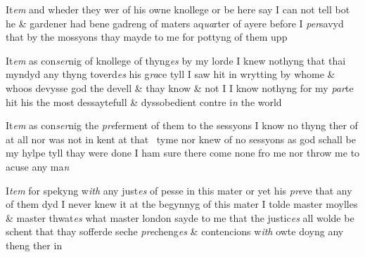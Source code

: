 \documentclass[12pt, a4paper]{book}
\begin{document}
            		
            			
				\marginpar[\vspace{0.5cm}{\textcolor{Gray}{5.}}]{}
			
            			
		\ifthenelse{\isodd{\thepage}}
		{\reversemarginpar}
		{\normalmarginpar}
		 It\textit{em} and wheder they wer of his owne knollege or be here
 say I can not tell bot he \& gardener had bene gadreng
 of maters aq\textit{ua}rter of ayere before I \textit{per}savyd that by
 the mossyons thay mayde to me for pottyng of them
 upp
            		
            		
            			
				\marginpar[\vspace{0.5cm}{\textcolor{Gray}{6.}}]{}
			
            			
		\ifthenelse{\isodd{\thepage}}
		{\reversemarginpar}
		{\normalmarginpar}
		 It\textit{em} as con\textit{ser}nig of knollege of thyng\textit{es} by my lorde I knew
            				nothyng that thai myndyd any thyng toverd\textit{es} his g\textit{ra}ce
 tyll I saw hit in wrytting by whome \& whoos devysse god
 the devell \& thay know \& not I I know nothyng for my \textit{par}te
 hit his the most dessaytefull \& dyssobedient contre i\textit{n} the world
            		
            		
            			
				\marginpar[\vspace{0.5cm}{\textcolor{Gray}{7.}}]{}
			
            			
		\ifthenelse{\isodd{\thepage}}
		{\reversemarginpar}
		{\normalmarginpar}
		 It\textit{em} as con\textit{ser}nig the \textit{pre}ferment of them to the sessyons I know
 no thyng ther of at all nor was not in kent at that 
 tyme nor knew of no sessyons as god schall be my
 hylpe tyll thay were done I ham sure there come
 none fro me nor throw me to acuse any ma\textit{n}
            		
            		
            			
				\marginpar[\vspace{0.5cm}{\textcolor{Gray}{8.}}]{}
			
            			
		\ifthenelse{\isodd{\thepage}}
		{\reversemarginpar}
		{\normalmarginpar}
		 I\textit{tem} for spekyng w\textit{ith} any just\textit{es} of pesse in this mater or
 yet his \textit{pre}ve that any of them dyd I never knew it
            				at the begynnyg of this mater I tolde master moylles
 \& master thwat\textit{es} what master london sayde to me that
 the justic\textit{es} all wolde be schent that thay sofferde seche
 \textit{pre}cheng\textit{es }\& contencions w\textit{ith} owte doyng any theng ther
 in
            		
\end{document}
